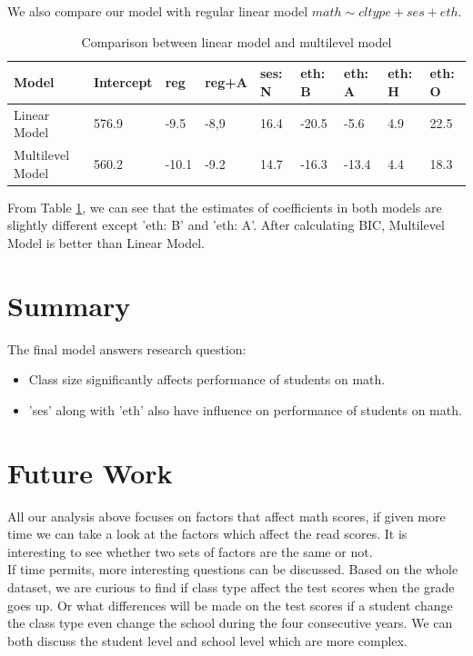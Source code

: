 \documentclass[11pt,a4paper]{article}
\begin{document}
We also compare our model with regular linear model $math \sim cltype + ses + eth$.

\begin{table}[h]
    \centering
    \caption{Comparison between linear model and multilevel model}
    \label{tab:lm}
    \begin{tabular}{|l|l|l|l|l|l|l|l|l|}
    \hline
    Model            & Intercept & reg         & reg+A         & ses: N & eth: B & eth: A & eth:  H & eth: O \\ \hline
    Linear Model     & 576.9     & -9.5        & -8,9          & 16.4   & -20.5  & -5.6   & 4.9     & 22.5   \\ \hline
    Multilevel Model & 560.2     & -10.1       & -9.2          & 14.7   & -16.3  & -13.4  & 4.4     & 18.3   \\ \hline
    \end{tabular}
\end{table}

From Table \ref{tab:lm}, we can see that the estimates of coefficients in both models are slightly different except 
'eth: B' and 'eth: A'. After calculating BIC, Multilevel Model is better than Linear Model.

\section{Summary}

The final model answers research question: 
\begin{itemize}
    \item Class size significantly affects performance of students on math.
    \item 'ses' along with 'eth' also have influence on performance of students on math.
\end{itemize}

\section{Future Work}

All our analysis above focuses on factors that affect math scores, if given more time we can take a look at the factors which affect the 
read scores. It is interesting to see whether two sets of factors are the same or not.\\

If time permits, more interesting questions can be discussed. Based on the whole dataset, we are curious to find if class type 
affect the test scores when the grade goes up. Or what differences will be made on the test scores if a student change the class 
type even change the school during the four consecutive years. We can both discuss the student level and school level which are 
more complex.
\end{document}
